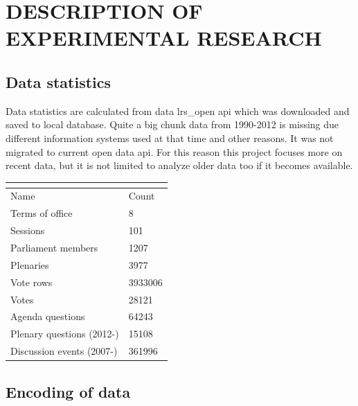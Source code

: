 \documentclass[a4paper,12pt]{article}
\begin{document}
 
    \clearpage
    
    \section{DESCRIPTION OF EXPERIMENTAL RESEARCH}
    \subsection{Data statistics}
    
   	Data statistics are calculated from data \gls{lrs_open} \acrshort{api} which was downloaded and saved to local database. Quite a big chunk data from 1990-2012 is missing due different information systems used at that time and other reasons. It was not migrated to current open data \acrshort{api}. For this reason this project focuses more on recent data, but it is not limited to analyze older data too if it becomes available.
    
   	\noindent
    \begin{center}
    	\begin{tabular}{L{5cm} R{3cm}}
    		\\ 
    		\hline
    		Name & Count \\\hline
    		Terms of office & 8\\
    		Sessions & 101\\
    		Parliament members & 1207\\
    		Plenaries & 3977\\
    		Vote rows & 3933006\\
    		Votes & 28121\\
    		Agenda questions & 64243\\
    		Plenary questions (2012-) & 15108\\
    		Discussion events (2007-) & 361996\\
    		\hline
    	\end{tabular}
    	 \label{tab:data_statistics}
    \end{center}

    
    \hfill 
    
   	\subsection{Encoding of data} 
   	
\end{document}
